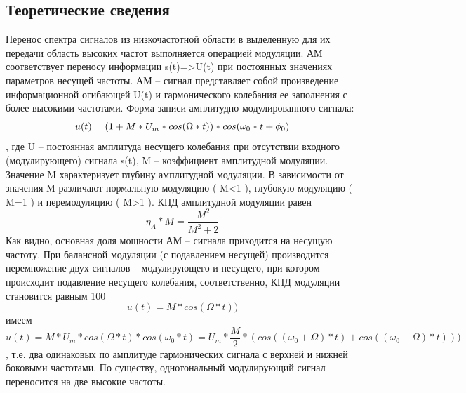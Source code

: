 \documentclass[10pt,a4paper]{article}
\begin{document}
\subsection{Теоретические сведения}
Перенос спектра сигналов из низкочастотной области в выделенную для их передачи область высоких частот выполняется операцией модуляции.
АМ соответствует переносу информации s(t)=>U(t) при постоянных значениях параметров несущей частоты. АМ – сигнал представляет собой произведение информационной огибающей U(t)  и гармонического колебания ее заполнения с более высокими частотами.
Форма записи амплитудно-модулированного сигнала:
\begin{displaymath}
u(t)=(1+M*U_{m}*cos(\Omega*t))*cos(\omega_{0}*t+\phi_{0})\newline
\end{displaymath}
, где U – постоянная амплитуда несущего колебания при отсутствии входного (модулирующего) сигнала s(t), M  – коэффициент амплитудной модуляции. Значение  M характеризует глубину амплитудной модуляции. В зависимости от значения  M различают нормальную модуляцию ( M<1 ), глубокую модуляцию ( M=1 ) и перемодуляцию ( M>1 ).
КПД амплитудной модуляции равен 
\begin{displaymath}
\eta_{A}*M=\frac{M^{2}}{M^{2}+2}
\end{displaymath}
Как видно, основная доля мощности АМ – сигнала приходится на несущую частоту. При балансной модуляции (с подавлением несущей) производится перемножение двух сигналов – модулирующего и несущего, при котором происходит подавление несущего колебания, соответственно, КПД модуляции становится равным 100%
\begin{displaymath}
u(t)=M*cos(\Omega*t))
\end{displaymath}  имеем
\begin{displaymath}
u(t)=M*U_{m}*cos(\Omega*t)*cos(\omega_{0}*t)=U_{m}*\frac{M}{2}*(cos((\omega_{0}+\Omega)*t)+cos((\omega_{0}-\Omega)*t)))
\end{displaymath}
 , т.е. два одинаковых по амплитуде гармонических сигнала с верхней и нижней боковыми частотами. По существу, однотональный модулирующий сигнал переносится на две высокие частоты.
\end{document}
